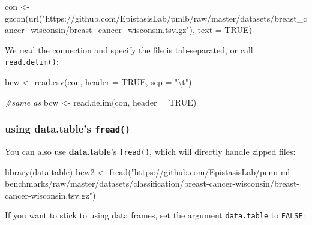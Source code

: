\documentclass[
]{book}
\newenvironment{Shaded}{\begin{snugshade}}{\end{snugshade}}
\newcommand{\AttributeTok}[1]{\textcolor[rgb]{0.77,0.63,0.00}{#1}}
\newcommand{\CommentTok}[1]{\textcolor[rgb]{0.56,0.35,0.01}{\textit{#1}}}
\newcommand{\ConstantTok}[1]{\textcolor[rgb]{0.00,0.00,0.00}{#1}}
\newcommand{\FunctionTok}[1]{\textcolor[rgb]{0.00,0.00,0.00}{#1}}
\newcommand{\NormalTok}[1]{#1}
\newcommand{\OtherTok}[1]{\textcolor[rgb]{0.56,0.35,0.01}{#1}}
\newcommand{\SpecialCharTok}[1]{\textcolor[rgb]{0.00,0.00,0.00}{#1}}
\newcommand{\StringTok}[1]{\textcolor[rgb]{0.31,0.60,0.02}{#1}}
\begin{document}
\begin{Shaded}
\begin{Highlighting}[]
\NormalTok{con }\OtherTok{\textless{}{-}} \FunctionTok{gzcon}\NormalTok{(}\FunctionTok{url}\NormalTok{(}\StringTok{"https://github.com/EpistasisLab/pmlb/raw/master/datasets/breast\_cancer\_wisconsin/breast\_cancer\_wisconsin.tsv.gz"}\NormalTok{),}
             \AttributeTok{text =} \ConstantTok{TRUE}\NormalTok{)}
\end{Highlighting}
\end{Shaded}

We read the connection and specify the file is tab-separated, or call \texttt{read.delim()}:

\begin{Shaded}
\begin{Highlighting}[]
\NormalTok{bcw }\OtherTok{\textless{}{-}} \FunctionTok{read.csv}\NormalTok{(con, }\AttributeTok{header =} \ConstantTok{TRUE}\NormalTok{, }\AttributeTok{sep =} \StringTok{"}\SpecialCharTok{\textbackslash{}t}\StringTok{"}\NormalTok{)}

\CommentTok{\#same as}
\NormalTok{bcw }\OtherTok{\textless{}{-}} \FunctionTok{read.delim}\NormalTok{(con, }\AttributeTok{header =} \ConstantTok{TRUE}\NormalTok{)}
\end{Highlighting}
\end{Shaded}

\hypertarget{using-data.tables-fread}{%
\subsubsection{\texorpdfstring{using \textbf{data.table}'s \texttt{fread()}}{using data.table's fread()}}\label{using-data.tables-fread}}

You can also use \textbf{data.table}'s \texttt{fread()}, which will directly handle zipped files:

\begin{Shaded}
\begin{Highlighting}[]
\FunctionTok{library}\NormalTok{(data.table)}
\NormalTok{bcw2 }\OtherTok{\textless{}{-}} \FunctionTok{fread}\NormalTok{(}\StringTok{"https://github.com/EpistasisLab/penn{-}ml{-}benchmarks/raw/master/datasets/classification/breast{-}cancer{-}wisconsin/breast{-}cancer{-}wisconsin.tsv.gz"}\NormalTok{)}
\end{Highlighting}
\end{Shaded}

If you want to stick to using data frames, set the argument \texttt{data.table} to \texttt{FALSE}:
\end{document}
